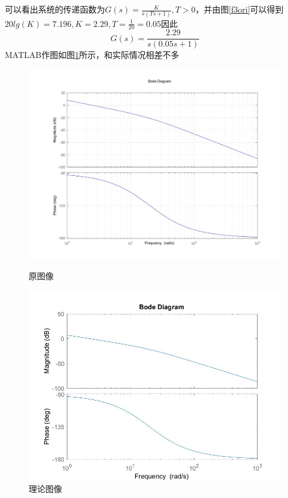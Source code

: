 \documentclass[UTF8,a4paper]{ctexart}
\begin{document}
\section{}
可以看出系统的传递函数为$G(s)=\frac{K}{s(Ts+1)},T>0$，并由图\ref{f3ori}可以得到$20lg(K)=7.196,K=2.29,T=\frac{1}{20}=0.05$因此$$G(s)=\frac{2.29}{s(0.05s+1)}$$MATLAB作图如图\ref{f3the}所示，和实际情况相差不多
\begin{figure}
\centering
\includegraphics[width=\textwidth]{motorG2.jpg}
\caption{原图像}
\label{f3ori}
\includegraphics[width=\textwidth]{RmotorG2.jpg}
\caption{理论图像}
\label{f3the}
\end{figure}
\section{}
\end{document}
